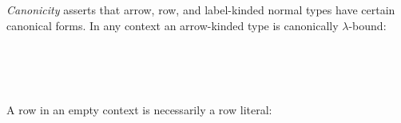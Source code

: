 \documentclass[sigplan,screen]{acmart}
\begin{document}
\emph{Canonicity}  asserts that arrow, row, and label-kinded normal types have certain canonical forms. In any context an arrow-kinded type is canonically $\lambda$-bound:

\begin{AgdaAlign}
\begin{code}%
%
\>[2]\AgdaSpace{}%
\AgdaSymbol{:}%
\>[2549I]\AgdaSymbol{(}\AgdaSpace{}%
\AgdaSymbol{:}\AgdaSpace{}%
\AgdaSpace{}%
\AgdaSpace{}%
\AgdaSymbol{(}\AgdaSpace{}%
\AgdaSpace{}%
\AgdaSymbol{))}\AgdaSpace{}%
\<%
\\
\>[.][@{}l@{}]\<[2549I]%
\>[21]\AgdaFunction{Σ[}\AgdaSpace{}%
\AgdaSpace{}%
\AgdaSpace{}%
\AgdaSymbol{(}\AgdaSpace{}%
\AgdaSymbol{(}\AgdaSpace{}%
\AgdaOperator{\AgdaInductiveConstructor{,}}\AgdaSpace{}%
\AgdaSymbol{)}\AgdaSpace{}%
\AgdaSymbol{)}\AgdaSpace{}%
\AgdaFunction{]}\<%
\\
%
\>[21]\AgdaSymbol{(}\AgdaSpace{}%
\AgdaSpace{}%
\AgdaSpace{}%
\AgdaSymbol{)}\<%
\\
%
\>[2]\AgdaSpace{}%
\AgdaSymbol{(}\AgdaSpace{}%
\AgdaSymbol{)}\AgdaSpace{}%
\AgdaSymbol{=}\AgdaSpace{}%
\AgdaSpace{}%
\AgdaOperator{\AgdaInductiveConstructor{,}}\AgdaSpace{}%
\<%
\end{code}
\end{AgdaAlign}

\Ni A row in an empty context is necessarily a row literal:
\end{document}
